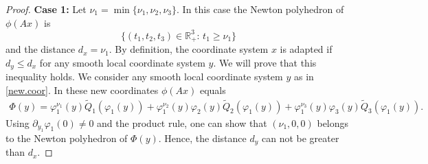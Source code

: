 \documentclass[a4paper, 11pt]{article}
\theoremstyle{plain}
\theoremstyle{definition}
\theoremstyle{lemma}
\theoremstyle{Remark}
\theoremstyle{proposition}
\theoremstyle{corollary}
\theoremstyle{example}
\theoremstyle{assumption}
\begin{document}
\begin{proof}
\textbf{Case 1: } Let $\nu_1= \min\{\nu_1,\nu_2,\nu_3\}.$
 In this case the Newton polyhedron of $\phi(Ax)$ is
$$\{(t_1, t_2, t_3)\in \mathbb{R}^3_{+}: \,t_1\geq \nu_1 \}$$
and the distance $d_x=\nu_1.$ By definition, the coordinate system $x$ is adapted if $d_y\leq d_x$ for any smooth local coordinate system $y.$ We will prove that this inequality holds.
  We consider any smooth  local coordinate system $y$ as in \eqref{new.coor}.  In these new coordinates $\phi (Ax)$ equals
 \begin{align*}
 \Phi(y)
 =\varphi_1^{\nu_1}(y)\tilde Q_1(\varphi_1(y))+\varphi_1^{\nu_2}(y) \varphi_2(y)\tilde Q_2(\varphi_1(y))+\varphi_1^{\nu_3}(y) \varphi_3(y)\tilde Q_3(\varphi_1(y)).
 \end{align*}
 Using $\partial_{y_1}\varphi_1(0)\neq 0$ and the product rule, one can show that $(\nu_1,0,0)$ belongs to the Newton polyhedron of $\Phi(y).$ Hence, the distance $d_y$ can not be greater than $d_x.$



\end{proof}
\end{document}

